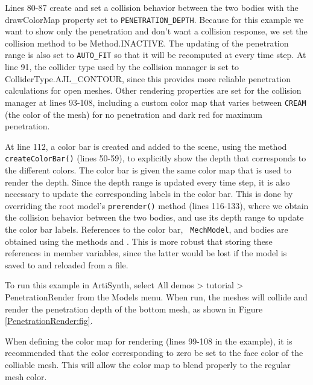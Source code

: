 Lines 80-87 create and set a collision behavior between the two bodies
with the {\sf drawColorMap} property set to
{\tt PENETRATION\_DEPTH}. Because for this example we
want to show only the penetration and don't want a collision response,
we set the collision method to be %
{Method.INACTIVE}. The updating of the penetration range is also set
to {\tt AUTO\_FIT} so that it will be recomputed at every time step.
At line 91, the collider type used by the collision manager is set to
%
{ColliderType.AJL\_CONTOUR}, since this provides more reliable penetration
calculations for open meshes.
Other rendering properties are set for the collision manager at lines
93-108, including a custom color map that varies between {\tt CREAM}
(the color of the mesh) for no penetration and dark red for maximum
penetration.

At line 112, a color bar is created and added to the scene, using the
method {\tt createColorBar()} (lines 50-59), to explicitly show the
depth that corresponds to the different colors. The color bar is given
the same color map that is used to render the depth. Since the depth
range is updated every time step, it is also necessary to update the
corresponding labels in the color bar. This is done by overriding the
root model's {\tt prerender()} method (lines 116-133), where we obtain
the collision behavior between the two bodies, and use its depth range
to update the color bar labels. References to the color bar, {\tt
MechModel}, and bodies are obtained using the
 methods
 and
.
This is more robust that storing these references in  member
variables, since the latter would be lost if the model is saved to and
reloaded from a file.

To run this example in ArtiSynth, select {\sf All demos > tutorial >
PenetrationRender} from the {\sf Models} menu. When run, the meshes
will collide and render the penetration depth of the bottom mesh, 
as shown in Figure \ref{PenetrationRender:fig}.

\begin{sideblock}
When defining the color map for rendering (lines 99-108 in the
example), it is recommended that the color corresponding to zero be
set to the face color of the colliable mesh.  This will allow
the color map to blend properly to the regular mesh color.
\end{sideblock}

